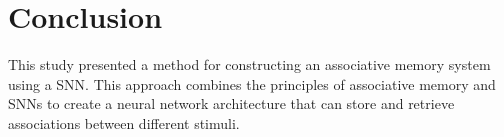 \chapter{Conclusion}%


This study presented a method for constructing an associative memory system
using a SNN. This approach combines the principles of associative memory and
SNNs to create a neural network architecture that can store and retrieve
associations between different stimuli.

